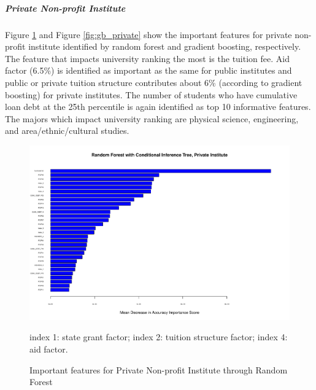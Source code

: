 \documentclass[11pt,letter]{article}
\begin{document}
\subparagraph{Private Non-profit Institute}
Figure \ref{fig:crf_private} and Figure \ref{fig:gb_private} show the important features for private non-profit institute identified by random forest and gradient boosting, respectively. The feature that impacts university ranking the most is the tuition fee. Aid factor (6.5\%) is identified as important as the same for public institutes and public or private tuition structure contributes about 6\% (according to gradient boosting) for private institutes. The number of students who have cumulative loan debt at the 25th percentile is again identified as top 10 informative features. The majors which impact university ranking are physical science, engineering, and area/ethnic/cultural studies.

\begin{figure}[H]
\begin{center}
\includegraphics[scale=0.4]{crf_private1}
\caption{Important features for Private Non-profit Institute through Random Forest}\label{fig:crf_private}
\vspace{-3mm}
\begin{flushleft}\small 
\centering
index 1: state grant factor; index 2: tuition structure factor; index 4: aid factor.
\end{flushleft}
\end{center}
\end{figure}
\end{document}

